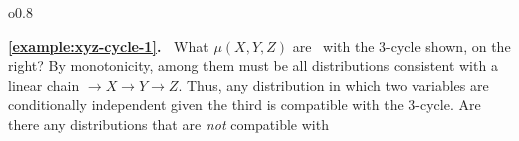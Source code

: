 \settowidth{\cycleboxlen}{\usebox{\cyclebox}}
\begin{wrapfigure}[5]{o}{0.8\cycleboxlen}
    \vspace{-0.8em}
\end{wrapfigure}
\textbf{\cref{example:xyz-cycle-1}.~} 
    What
    $\mu(X,Y,Z)$
    are \cible\ 
    with 
    the 3-cycle shown, on the right?
    By monotonicity,
    among them must be all distributions consistent with a linear chain ${\to}X{\to}Y{\to}Z$. Thus,  
        any distribution
    in which two variables are conditionally independent given the third
    is compatible with 
    the 3-cycle.
    Are there any distributions that are \emph{not} compatible with 
